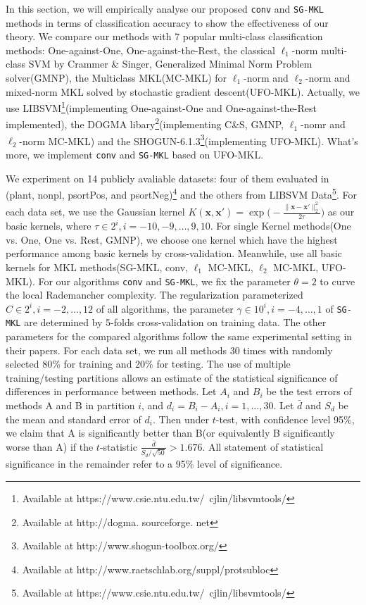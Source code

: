 \documentclass{article}
\begin{document}
In this section, we will empirically analyse our proposed \texttt{conv} and \texttt{SG-MKL} methods in terms of classification accuracy to show the effectiveness of our theory. We compare our methods with 7 popular multi-class classification methods: One-against-One\cite{knerr1990single}, One-against-the-Rest\cite{bottou1994comparison}, the classical $\ell_1$-norm multi-class SVM by Crammer \& Singer\cite{CrammerS02}, Generalized Minimal Norm Problem solver(GMNP)\cite{franc2005optimization}, the Multiclass MKL(MC-MKL) for $\ell_1$-norm and $\ell_2$-norm\cite{ZienO2007} and mixed-norm MKL solved by stochastic gradient descent(UFO-MKL)\cite{OrabonaL11}. Actually, we use LIBSVM\footnote{Available at https://www.csie.ntu.edu.tw/~cjlin/libsvmtools/}(implementing One-against-One and One-against-the-Rest implemented), the DOGMA libary\footnote{Available at http://dogma. sourceforge. net}\cite{orabona2009dogma}(implementing C\&S, GMNP, $\ell_1$-nomr and $\ell_2$-norm MC-MKL) and the SHOGUN-6.1.3\footnote{Available at http://www.shogun-toolbox.org/}(implementing UFO-MKL). What's more, we implement \texttt{conv} and \texttt{SG-MKL} based on UFO-MKL.

We experiment on 14 publicly avaliable datasets: four of them evaluated in \cite{ZienO2007}(plant, nonpl, psortPos, and psortNeg)\footnote{Available at http://www.raetschlab.org/suppl/protsubloc} and the others from LIBSVM Data\footnote{Available at https://www.csie.ntu.edu.tw/~cjlin/libsvmtools/}. For each data set, we use the Gaussian kernel $K(\mathbf{x}, \mathbf{x}')=\exp\Big(-\frac{\|\mathbf{x}-\mathbf{x}'\|_2^2}{2\tau}\Big)$ as our basic kernels, where $\tau \in {2^i, i=-10,-9,\ldots,9,10}$. For single Kernel methods(One vs. One, One vs. Rest, GMNP), we choose one kernel which have the highest performance among basic kernels by cross-validation. Meanwhile, use all basic kernels for MKL methods(SG-MKL, conv, $\ell_1$ MC-MKL, $\ell_2$ MC-MKL, UFO-MKL). For our algorithms \texttt{conv} and \texttt{SG-MKL}, we fix the parameter $\theta=2$ to curve the local Rademancher complexity. The regularization parameterized $C \in {2^i, i=-2, \ldots, 12}$ of all algorithms, the parameter $\gamma \in {10^i, i=-4, \ldots, 1}$ of \texttt{SG-MKL} are determined by 5-folds cross-validation on training data. The other parameters for the compared algorithms follow the same experimental setting in their papers. For each data set, we run all methods 30 times with randomly selected 80\% for training and 20\% for testing. The use of multiple training/testing partitions allows an estimate of the statistical significance of differences in performance between methods. Let $A_i$ and $B_i$ be the test errors of methods A and B in partition $i$, and $d_i=B_i-A_i, i=1,\ldots,30$. Let $\bar{d}$ and $S_d$ be the mean and standard error of $d_i$. Then under $t$-test, with confidence level 95\%, we claim that A is significantly better than B(or equivalently B significantly worse than A) if the $t$-statistic $\frac{\bar{d}}{S_d/\sqrt{50}} > 1.676$. All statement of statistical significance in the remainder refer to a 95\% level of significance.
\end{document}
